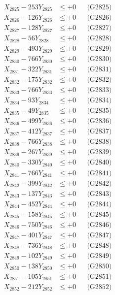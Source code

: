 \documentclass[a4paper,10pt]{article}
\begin{document}
{\begin{align}
X_{2825} - 253Y_{2825} &\leq +0 && \text{(G2825)} \\
X_{2826} - 126Y_{2826} &\leq +0 && \text{(G2826)} \\
X_{2827} - 128Y_{2827} &\leq +0 && \text{(G2827)} \\
X_{2828} - 56Y_{2828} &\leq +0 && \text{(G2828)} \\
X_{2829} - 493Y_{2829} &\leq +0 && \text{(G2829)} \\
X_{2830} - 766Y_{2830} &\leq +0 && \text{(G2830)} \\
\allowbreak
X_{2831} - 322Y_{2831} &\leq +0 && \text{(G2831)} \\
X_{2832} - 175Y_{2832} &\leq +0 && \text{(G2832)} \\
X_{2833} - 766Y_{2833} &\leq +0 && \text{(G2833)} \\
X_{2834} - 93Y_{2834} &\leq +0 && \text{(G2834)} \\
X_{2835} - 49Y_{2835} &\leq +0 && \text{(G2835)} \\
X_{2836} - 499Y_{2836} &\leq +0 && \text{(G2836)} \\
X_{2837} - 412Y_{2837} &\leq +0 && \text{(G2837)} \\
X_{2838} - 766Y_{2838} &\leq +0 && \text{(G2838)} \\
X_{2839} - 267Y_{2839} &\leq +0 && \text{(G2839)} \\
X_{2840} - 330Y_{2840} &\leq +0 && \text{(G2840)} \\
\allowbreak
X_{2841} - 766Y_{2841} &\leq +0 && \text{(G2841)} \\
X_{2842} - 399Y_{2842} &\leq +0 && \text{(G2842)} \\
X_{2843} - 137Y_{2843} &\leq +0 && \text{(G2843)} \\
X_{2844} - 452Y_{2844} &\leq +0 && \text{(G2844)} \\
X_{2845} - 158Y_{2845} &\leq +0 && \text{(G2845)} \\
X_{2846} - 750Y_{2846} &\leq +0 && \text{(G2846)} \\
X_{2847} - 401Y_{2847} &\leq +0 && \text{(G2847)} \\
X_{2848} - 736Y_{2848} &\leq +0 && \text{(G2848)} \\
X_{2849} - 102Y_{2849} &\leq +0 && \text{(G2849)} \\
X_{2850} - 138Y_{2850} &\leq +0 && \text{(G2850)} \\
\allowbreak
X_{2851} - 105Y_{2851} &\leq +0 && \text{(G2851)} \\
X_{2852} - 212Y_{2852} &\leq +0 && \text{(G2852)} \\

\end{align}}
\end{document}
